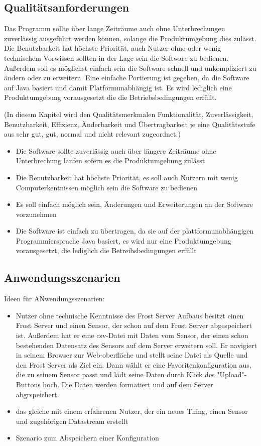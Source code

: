\documentclass[12 pt]{article}
\begin{document}
\subsection{Qualitätsanforderungen}
Das Programm sollte über lange Zeiträume auch ohne Unterbrechungen zuverlässig ausgeführt werden können, solange die Produktumgebung dies zulässt.
Die Benutzbarkeit hat höchste Priorität, auch Nutzer ohne oder wenig technischem Vorwissen sollten in der Lage sein die Software zu bedienen.
Außerdem soll es möglichst einfach sein die Software schnell und unkompliziert zu ändern oder zu erweitern.
Eine einfache Portierung ist gegeben, da die Software auf Java basiert und damit Platformunabhängig ist. Es wird lediglich eine Produktumgebung vorausgesetzt die die Betriebsbedingungen erfüllt.

(In diesem Kapitel wird den Qualitätsmerkmalen Funktionalität, Zuverlässigkeit, Benutzbarkeit, Effizienz, Änderbarkeit und Übertragbarkeit je eine Qualitätsstufe aus sehr gut, gut, normal und nicht relevant zugeordnet.)
\begin{itemize}
\item Die Software sollte zuverlässig auch über längere Zeiträume ohne Unterbrechung laufen sofern es die Produktumgebung zulässt
\item Die Benutzbarkeit hat höchste Priorität, es soll auch Nutzern mit wenig Computerkentnissen möglich sein die Software zu bedienen
\item Es soll einfach möglich sein, Änderungen und Erweiterungen an der Software vorzunehmen
\item Die Software ist einfach zu übertragen, da sie auf der plattformunabhängigen Programmiersprache Java basiert, es wird nur eine Produktumgebung vorausgesetzt, die lediglich die Betreibsbedingungen erfüllt
\end{itemize}

\subsection{Anwendungsszenarien}
Ideen für ANwendungsszenarien:
\begin{itemize}
\item Nutzer ohne technische Kenntnisse des Frost Server Aufbaus besitzt einen Frost Server und einen Sensor, der schon auf dem Frost Server abgespeichert ist. Außerdem hat er eine csv-Datei mit Daten vom Sensor, der einen schon bestehenden Datensatz des Sensors auf dem Server erweitern soll. Er navigiert in seinem Browser zur Web-oberfläche und stellt seine Datei als Quelle und den Frost Server als Ziel ein. Dann wählt er eine Favoritenkonfiguration aus, die zu seinem Sensor passt und lädt seine Daten durch Klick des "Upload"-Buttons hoch. Die Daten werden formatiert und auf dem Server abgrspeichert.
\item das gleiche mit einem erfahrenen Nutzer, der ein neues Thing, einen Sensor und zugehörigen Datastream erstellt
\item Szenario zum Abspeichern einer Konfiguration
\end{itemize}
\end{document}
